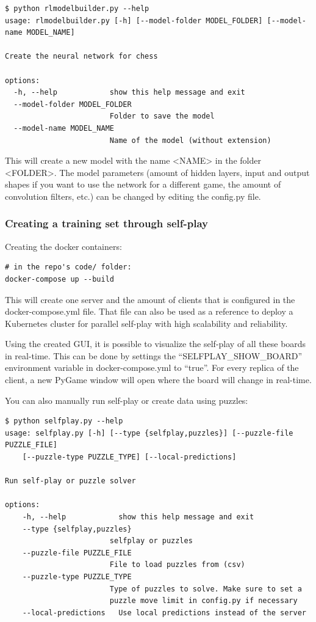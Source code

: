 \documentclass{article}
\begin{document}
\begin{verbatim}
$ python rlmodelbuilder.py --help
usage: rlmodelbuilder.py [-h] [--model-folder MODEL_FOLDER] [--model-name MODEL_NAME]

Create the neural network for chess

options:
  -h, --help            show this help message and exit
  --model-folder MODEL_FOLDER
                        Folder to save the model
  --model-name MODEL_NAME
                        Name of the model (without extension)
\end{verbatim}

This will create a new model with the name <NAME> in the folder <FOLDER>.
The model parameters (amount of hidden layers, input and output shapes if you want to use the network for a different game, the amount of convolution filters, etc.)
can be changed by editing the config.py file.

\subsubsection{Creating a training set through self-play}

Creating the docker containers:

\begin{verbatim}
# in the repo's code/ folder:
docker-compose up --build
\end{verbatim}

This will create one server and the amount of clients that is configured in the docker-compose.yml file.
That file can also be used as a reference to deploy a Kubernetes cluster for parallel self-play with 
high scalability and reliability. 

Using the created GUI, it is possible to visualize the self-play of all these boards in real-time.
This can be done by settings the ``SELFPLAY\_SHOW\_BOARD'' environment variable in docker-compose.yml to ``true''.
For every replica of the client, a new PyGame window will open where the board will change in real-time. 

You can also manually run self-play or create data using puzzles:

\begin{verbatim}
$ python selfplay.py --help
usage: selfplay.py [-h] [--type {selfplay,puzzles}] [--puzzle-file PUZZLE_FILE] 
    [--puzzle-type PUZZLE_TYPE] [--local-predictions]

Run self-play or puzzle solver

options:
    -h, --help            show this help message and exit
    --type {selfplay,puzzles}
                        selfplay or puzzles
    --puzzle-file PUZZLE_FILE
                        File to load puzzles from (csv)
    --puzzle-type PUZZLE_TYPE
                        Type of puzzles to solve. Make sure to set a 
                        puzzle move limit in config.py if necessary
    --local-predictions   Use local predictions instead of the server
\end{verbatim}
\end{document}

